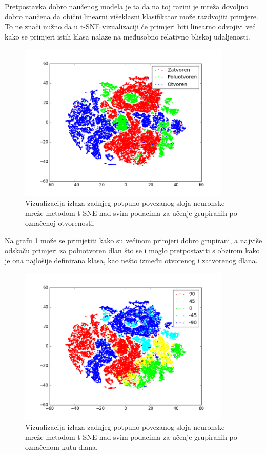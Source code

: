\documentclass[times, utf8, diplomski, numeric]{fer}
\begin{document}
Pretpostavka dobro naučenog modela je ta da na toj razini je mreža dovoljno dobro naučena da obični linearni višeklasni klasifikator može razdvojiti primjere. To ne znači nužno da u t-SNE vizualizaciji će primjeri biti linearno odvojivi već kako se primjeri istih klasa nalaze na međusobno relativno bliskoj udaljenosti.

\begin{figure}[h!]
\centering
\includegraphics[width = 0.9\textwidth]{detekcija/train_otvorenost}
\caption{Vizualizacija izlaza zadnjeg potpuno povezanog sloja neuronske mreže metodom t-SNE nad svim podacima za učenje grupiranih po označenoj otvorenosti.} \label{tsne-otvorenost}
\end{figure}

Na grafu \ref{tsne-otvorenost} može se primjetiti kako su većinom primjeri dobro grupirani, a najviše odskaču primjeri za poluotvoren dlan što se i moglo pretpostaviti s obzirom kako je ona najlošije definirana klasa, kao nešto između otvorenog i zatvorenog dlana.

\begin{figure}[h!]
\centering
\includegraphics[width = 0.9\textwidth]{detekcija/train_kut}
\caption{Vizualizacija izlaza zadnjeg potpuno povezanog sloja neuronske mreže metodom t-SNE nad svim podacima za učenje grupiranih po označenom kutu dlana.} \label{tsne-kut}
\end{figure}
\end{document}

